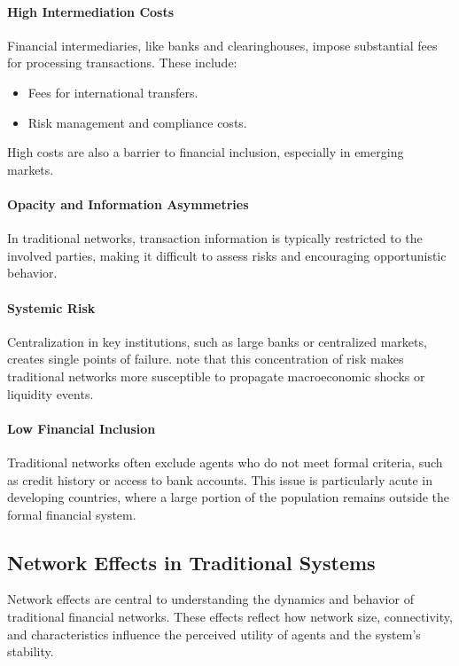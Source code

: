 \paragraph{High Intermediation Costs}
Financial intermediaries, like banks and clearinghouses, impose substantial fees for processing transactions. These include:

\begin{itemize}
    \item Fees for international transfers.
    \item Risk management and compliance costs.
\end{itemize}

High costs are also a barrier to financial inclusion, especially in emerging markets.

\paragraph{Opacity and Information Asymmetries}
In traditional networks, transaction information is typically restricted to the involved parties, making it difficult to assess risks and encouraging opportunistic behavior. 

\paragraph{Systemic Risk}
Centralization in key institutions, such as large banks or centralized markets, creates single points of failure.  note that this concentration of risk makes traditional networks more susceptible to propagate macroeconomic shocks or liquidity events.

\paragraph{Low Financial Inclusion}
Traditional networks often exclude agents who do not meet formal criteria, such as credit history or access to bank accounts. This issue is particularly acute in developing countries, where a large portion of the population remains outside the formal financial system. \cite{singer_financial_2017}

\subsection{Network Effects in Traditional Systems}

Network effects are central to understanding the dynamics and behavior of traditional financial networks. These effects reflect how network size, connectivity, and characteristics influence the perceived utility of agents and the system's stability.

